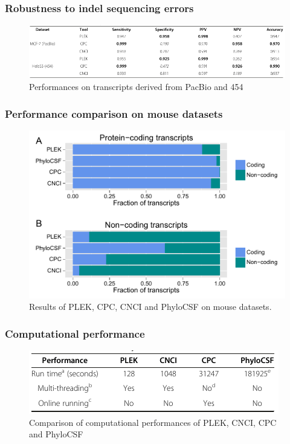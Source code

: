\documentclass[hyperref={pdfpagelabels=false}]{beamer}
\begin{document}
\begin{frame}
\frametitle{Robustness to indel sequencing errors}
\begin{figure}
	\centering
	\includegraphics[scale=0.45]{fig3}
	\caption{Performances on transcripts derived from PacBio and 454}
	\label{fig:fig3}
\end{figure}
\end{frame}

\begin{frame}
\frametitle{Performance comparison on mouse datasets}
\begin{figure}
	\centering
	\includegraphics[scale=0.5]{fig4}
	\caption{Results of PLEK, CPC, CNCI and PhyloCSF on mouse datasets.}
	\label{fig:fig4}
\end{figure}
\end{frame}

\begin{frame}
\frametitle{Computational performance}
\begin{figure}
	\centering
	\includegraphics[scale=0.5]{fig5}
	\caption{Comparison of computational performances of PLEK, CNCI, CPC and PhyloCSF}
	\label{fig:fig5}
\end{figure}
\end{frame}
\end{document}
